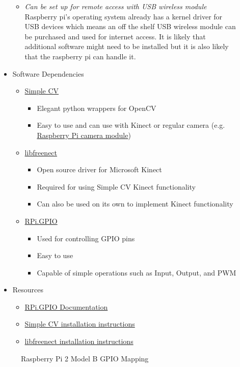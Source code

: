 \documentclass[12pt]{article}
\begin{document}
\begin{description}
\begin{itemize}
\begin{itemize}
					\item \textit{Can be set up for remote access with USB wireless module} \\
						Raspberry pi's operating system already has a kernel driver for USB devices which means an off the shelf USB wireless module can be purchased and used for internet access.
						It is likely that additional software might need to be installed but it is also likely that the raspberry pi can handle it.
				\end{itemize}
			\item Software Dependencies
				\begin{itemize}
					\item \href{https://github.com/sightmachine/SimpleCV/tree/develop}{Simple CV}
						\begin{itemize}
							\item Elegant python wrappers for OpenCV
							\item Easy to use and can use with Kinect or regular camera (e.g. \href{https://www.raspberrypi.org/products/camera-module/}{Raspberry Pi camera module})
						\end{itemize}
					\item \href{https://github.com/OpenKinect/libfreenect}{libfreenect}
						\begin{itemize}
							\item Open source driver for Microsoft Kinect
							\item Required for using Simple CV Kinect functionality
							\item Can also be used on its own to implement Kinect functionality
						\end{itemize}
					\item \href{http://sourceforge.net/p/raspberry-gpio-python/wiki/install/}{RPi.GPIO}
						\begin{itemize}
							\item Used for controlling GPIO pins
							\item Easy to use
							\item Capable of simple operations such as Input, Output, and PWM
						\end{itemize}
				\end{itemize}
			\item Resources
				\begin{itemize}
					\item \href{http://sourceforge.net/p/raspberry-gpio-python/wiki/}{RPi.GPIO Documentation}
					\item \href{https://github.com/sightmachine/SimpleCV/blob/develop/doc/HOWTO-Install\%20on\%20RaspberryPi.rst}{Simple CV installation instructions}
					\item \href{http://openkinect.org/wiki/Getting_Started}{libfreenect installation instructions}
				\end{itemize}
		\end{itemize}
		\begin{figure}[H]
			\centering
			\caption{Raspberry Pi 2 Model B GPIO Mapping}
		\end{figure}
\end{description}
\end{document}
